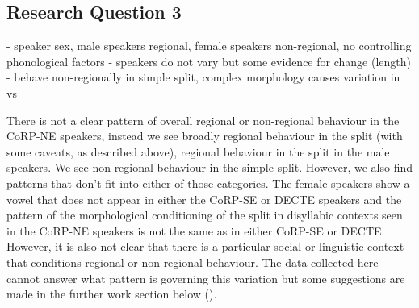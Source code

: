 \documentclass[../../00.FullDoc/tex/ThesisSkeleton-draft2]{subfiles}
\begin{document}

\subsection{Research Question 3} \label{sec:disc:RQ3}

\FS{} - speaker sex, male speakers regional, female speakers non-regional, no controlling phonological factors
\TB{} - speakers do not vary but some evidence for change (length)
\GG{} - behave non-regionally in simple split, complex morphology causes variation in \holy{} vs \holey{} 

There is not a clear pattern of overall regional or non-regional behaviour in the CoRP-NE speakers, instead we see broadly regional behaviour in the \TB{} split (with some caveats, as described above), regional behaviour in the \FS{} split in the male speakers. We see non-regional behaviour in the simple \GG{} split. However, we also find patterns that don't fit into either of those categories. The female speakers show a \strutt{} vowel that does not appear in either the CoRP-SE or DECTE speakers and the pattern of the morphological conditioning of the \GG{} split in disyllabic contexts seen in the CoRP-NE speakers is not the same as in either CoRP-SE or DECTE. However, it is also not clear that there is a particular social or linguistic context that conditions regional or non-regional behaviour. The data collected here cannot answer what pattern is governing this variation but some suggestions are made in the further work section below ().


%
%
%
%
%
\end{document}
